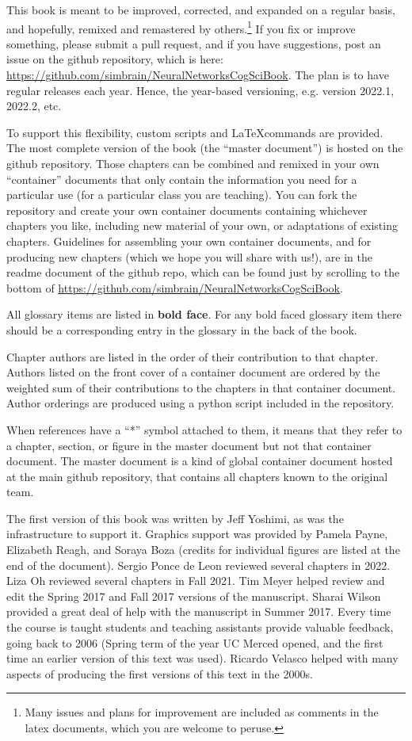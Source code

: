 This book is meant to be improved, corrected, and expanded on a regular basis, and hopefully, remixed and remastered by others.\footnote{Many issues and plans for improvement are included as comments in the latex documents, which you are welcome to peruse.} If you fix or improve something, please submit a pull request, and if you have suggestions, post an issue on the github repository, which is here: \url{https://github.com/simbrain/NeuralNetworksCogSciBook}. The plan is to have regular releases each year. Hence, the year-based versioning, e.g. version 2022.1, 2022.2, etc.

To support this flexibility, custom scripts and \LaTeX commands are provided. The most complete version of the book (the ``master document'') is hosted on the github repository. Those chapters can be combined and remixed in your own ``container'' documents that only contain the information you need for a particular use (\eg for a particular class you are teaching). You can fork the repository and  create your own container documents containing whichever chapters you like, including new material of your own, or adaptations of existing chapters. Guidelines for assembling your own container documents, and for producing new chapters (which we hope you will share with us!), are in the readme document of the github repo, which can be found just by scrolling to the bottom of \url{https://github.com/simbrain/NeuralNetworksCogSciBook}.

All glossary items are listed in \textbf{bold face}. For any bold faced glossary item there should be a corresponding entry in the glossary in the back of the book.

Chapter authors are listed in the order of their contribution to that chapter. Authors listed on the front cover of a container document are ordered by the weighted sum of their contributions to the chapters in that container document. Author orderings are produced using a python script included in the repository.

When references have a ``*'' symbol attached to them, it means that they refer to a chapter, section, or figure in the master document but not that container document. The master document is a kind of global container document hosted at the main github repository, that contains all chapters known to the original team.

The first version of this book was written by Jeff Yoshimi, as was the infrastructure to support it. Graphics support was provided by Pamela Payne, Elizabeth Reagh, and Soraya Boza (credits for individual figures are listed at the end of the document). Sergio Ponce de Leon reviewed several chapters in 2022.  Liza Oh reviewed several chapters in Fall 2021. Tim Meyer helped review and edit the Spring 2017 and Fall 2017 versions of the manuscript.  Sharai Wilson provided a great deal of help with the manuscript in Summer 2017. Every time the course is taught students and teaching assistants provide valuable feedback, going back to 2006 (Spring term of the year UC Merced opened, and the first time an earlier version of this text was used). Ricardo Velasco helped with many aspects of producing the first versions of this text in the 2000s.

